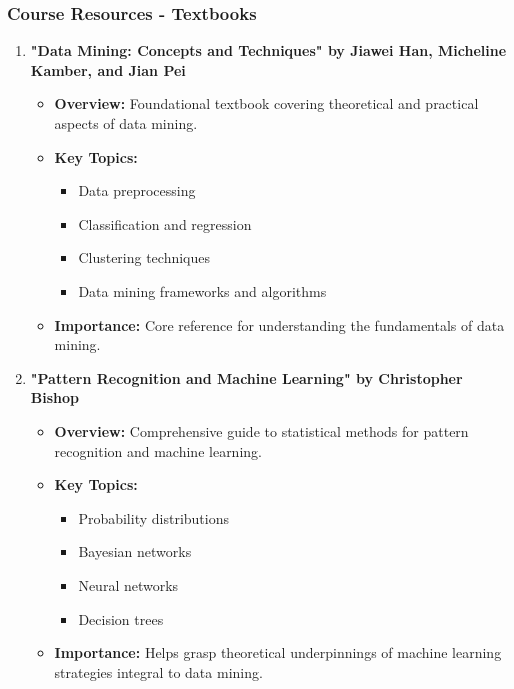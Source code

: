\documentclass[aspectratio=169]{beamer}
\begin{document}
\begin{frame}[fragile]
    \frametitle{Course Resources - Textbooks}
    \begin{enumerate}
        \item \textbf{"Data Mining: Concepts and Techniques" by Jiawei Han, Micheline Kamber, and Jian Pei}
            \begin{itemize}
                \item \textbf{Overview:} Foundational textbook covering theoretical and practical aspects of data mining.
                \item \textbf{Key Topics:}
                    \begin{itemize}
                        \item Data preprocessing
                        \item Classification and regression
                        \item Clustering techniques
                        \item Data mining frameworks and algorithms
                    \end{itemize}
                \item \textbf{Importance:} Core reference for understanding the fundamentals of data mining.
            \end{itemize}
        
        \item \textbf{"Pattern Recognition and Machine Learning" by Christopher Bishop}
            \begin{itemize}
                \item \textbf{Overview:} Comprehensive guide to statistical methods for pattern recognition and machine learning.
                \item \textbf{Key Topics:}
                    \begin{itemize}
                        \item Probability distributions
                        \item Bayesian networks
                        \item Neural networks
                        \item Decision trees
                    \end{itemize}
                \item \textbf{Importance:} Helps grasp theoretical underpinnings of machine learning strategies integral to data mining.
            \end{itemize}
    \end{enumerate}
\end{frame}
\end{document}
